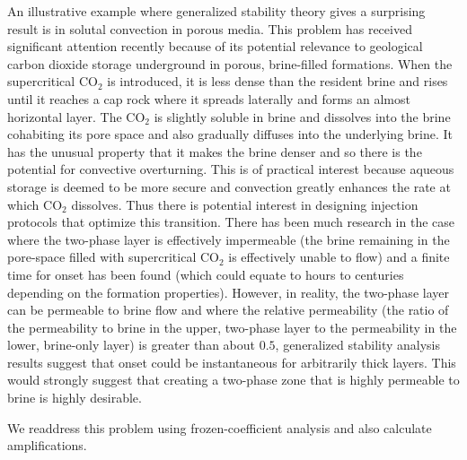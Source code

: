 \documentclass[letterpaper,prl,aps,twocolumn,reprint,superscriptaddress]{revtex4-1}
\newcommand{\COtwo}[1]{CO$_2$ }
\begin{document}
An illustrative example where generalized stability theory gives a surprising result is in solutal convection in porous media.  This problem has received significant attention recently because of its potential relevance to geological carbon dioxide storage underground in porous, brine-filled formations.  When the supercritical \COtwo{} is introduced, it is less dense than the resident brine and rises until it reaches a cap rock where it spreads laterally and forms an almost horizontal layer.  The \COtwo{} is slightly soluble in brine and dissolves into the brine cohabiting its pore space and also gradually diffuses into the underlying brine.  It has the unusual property that it makes the brine denser and so there is the potential for convective overturning.  This is of practical interest because aqueous storage is deemed to be more secure and convection greatly enhances the rate at which \COtwo{} dissolves.  Thus there is potential interest in designing injection protocols that optimize this transition.  There has been much research in the case where the two-phase layer is effectively impermeable (the brine remaining in the pore-space filled with supercritical \COtwo{} is effectively unable to flow) and a finite time for onset has been found (which could equate to hours to centuries depending on the formation properties).  However, in reality, the two-phase layer can be permeable to brine flow and where the relative permeability (the ratio of the permeability to brine in the upper, two-phase layer to the permeability in the lower, brine-only layer) is greater than about $0.5$, generalized stability analysis results suggest that onset could be instantaneous for arbitrarily thick layers.  This would strongly suggest that creating a two-phase zone that is highly permeable to brine is highly desirable.  

We readdress this problem using frozen-coefficient analysis and also calculate amplifications.  
\end{document}
